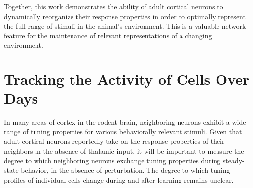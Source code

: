 \bigskip

Together, this work demonstrates the ability of adult cortical neurons to dynamically reorganize their response properties in order to optimally represent the full range of stimuli in the animal’s environment. This is a valuable network feature for the maintenance of relevant representations of a changing environment.

\section{Tracking the Activity of Cells Over Days}

In many areas of cortex in the rodent brain, neighboring neurons exhibit a wide range of tuning properties for various behaviorally relevant stimuli. Given that adult cortical neurons reportedly take on the response properties of their neighbors in the absence of thalamic input, it will be important to measure the degree to which neighboring neurons exchange tuning properties during steady-state behavior, in the absence of perturbation. The degree to which tuning profiles of individual cells change during and after learning remains unclear.

\bigskip

